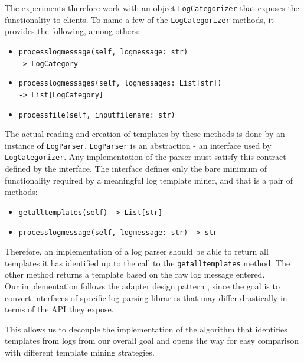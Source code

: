 The experiments therefore work with an object \texttt{LogCategorizer} that exposes the functionality to clients. To name a few of the \texttt{LogCategorizer} methods, it provides the following, among others:

\begin{itemize}
    \item \texttt{process\textunderscore log\textunderscore message(self, log\textunderscore message: str)\\ -> LogCategory}
    \item \texttt{process\textunderscore log\textunderscore messages(self, log\textunderscore messages: List[str])\\ -> List[LogCategory]}
    \item \texttt{process\textunderscore file(self, input\textunderscore file\textunderscore name: str)}
\end{itemize}

The actual reading and creation of templates by these methods is done by an instance of \texttt{LogParser}. \texttt{LogParser} is an abstraction - an interface used by \texttt{LogCategorizer}. Any implementation of the parser must satisfy this contract defined by the interface. The interface defines only the bare minimum of functionality required by a meaningful log template miner, and that is a pair of methods:
\begin{itemize}
    \item \texttt{get\textunderscore all\textunderscore templates(self) -> List[str]}
    \item \texttt{process\textunderscore log\textunderscore message(self, log\textunderscore message: str) -> str}
\end{itemize}
Therefore, an implementation of a log parser should be able to return all templates it has identified up to the call to the \texttt{get\textunderscore all\textunderscore templates} method. The other method returns a template based on the raw log message entered.\\

Our implementation follows the adapter design pattern \cite{gamma1995design_pattern_adapter}, since the goal is to convert interfaces of specific log parsing libraries that may differ drastically in terms of the API they expose.

This allows us to decouple the implementation of the algorithm that identifies templates from logs from our overall goal and opens the way for easy comparison with different template mining strategies.\\

